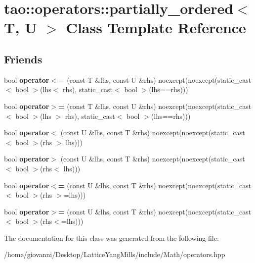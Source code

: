 \hypertarget{classtao_1_1operators_1_1partially__ordered}{}\section{tao\+:\+:operators\+:\+:partially\+\_\+ordered$<$ T, U $>$ Class Template Reference}
\label{classtao_1_1operators_1_1partially__ordered}
\subsection*{Friends}
\begin{DoxyCompactItemize}
\item 
bool {\bfseries operator$<$=} (const T \&lhs, const U \&rhs) noexcept(noexcept(static\+\_\+cast$<$ bool $>$(lhs$<$ rhs), static\+\_\+cast$<$ bool $>$(lhs==rhs)))\hypertarget{classtao_1_1operators_1_1partially__ordered_a268db8f176e7de618e3487a6f9bbb43a}{}\label{classtao_1_1operators_1_1partially__ordered_a268db8f176e7de618e3487a6f9bbb43a}

\item 
bool {\bfseries operator$>$=} (const T \&lhs, const U \&rhs) noexcept(noexcept(static\+\_\+cast$<$ bool $>$(lhs $>$ rhs), static\+\_\+cast$<$ bool $>$(lhs==rhs)))\hypertarget{classtao_1_1operators_1_1partially__ordered_ada7a69b538ddb717fae8776131d10c0b}{}\label{classtao_1_1operators_1_1partially__ordered_ada7a69b538ddb717fae8776131d10c0b}

\item 
bool {\bfseries operator$<$} (const U \&lhs, const T \&rhs) noexcept(noexcept(static\+\_\+cast$<$ bool $>$(rhs $>$ lhs)))\hypertarget{classtao_1_1operators_1_1partially__ordered_aa864eedf6200b61eb960901241ffa350}{}\label{classtao_1_1operators_1_1partially__ordered_aa864eedf6200b61eb960901241ffa350}

\item 
bool {\bfseries operator$>$} (const U \&lhs, const T \&rhs) noexcept(noexcept(static\+\_\+cast$<$ bool $>$(rhs$<$ lhs)))\hypertarget{classtao_1_1operators_1_1partially__ordered_a240258602e3bc12acace0cf18ebc6792}{}\label{classtao_1_1operators_1_1partially__ordered_a240258602e3bc12acace0cf18ebc6792}

\item 
bool {\bfseries operator$<$=} (const U \&lhs, const T \&rhs) noexcept(noexcept(static\+\_\+cast$<$ bool $>$(rhs $>$=lhs)))\hypertarget{classtao_1_1operators_1_1partially__ordered_ad9e95f30ae99649b5f5f6c1d96018328}{}\label{classtao_1_1operators_1_1partially__ordered_ad9e95f30ae99649b5f5f6c1d96018328}

\item 
bool {\bfseries operator$>$=} (const U \&lhs, const T \&rhs) noexcept(noexcept(static\+\_\+cast$<$ bool $>$(rhs$<$=lhs)))\hypertarget{classtao_1_1operators_1_1partially__ordered_aa8c6aaf5db19ceb0d85f9af3081e73d9}{}\label{classtao_1_1operators_1_1partially__ordered_aa8c6aaf5db19ceb0d85f9af3081e73d9}

\end{DoxyCompactItemize}


The documentation for this class was generated from the following file\+:\begin{DoxyCompactItemize}
\item 
/home/giovanni/\+Desktop/\+Lattice\+Yang\+Mills/include/\+Math/operators.\+hpp\end{DoxyCompactItemize}
